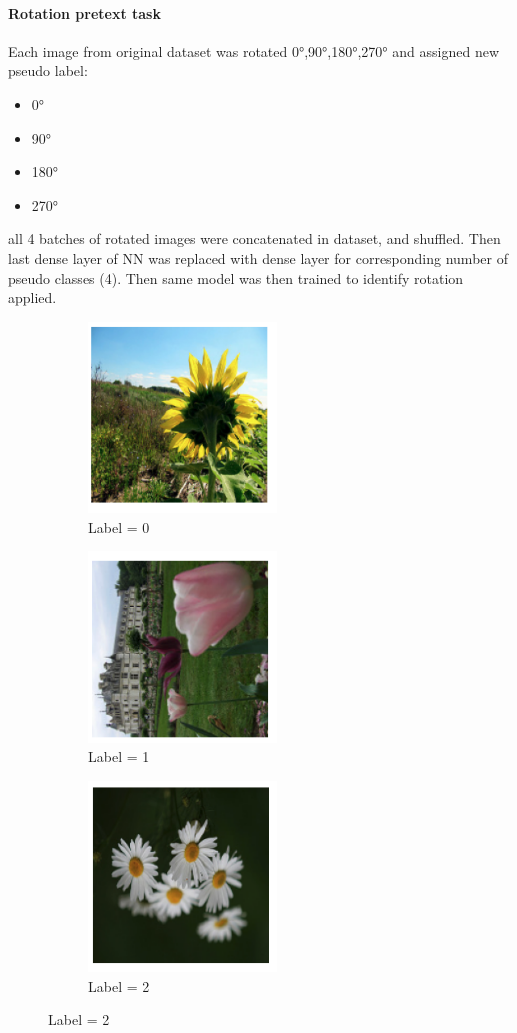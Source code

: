 \paragraph{Rotation pretext task}
Each image from original dataset was rotated 0°,90°,180°,270° and assigned new pseudo label:
\begin{itemize}
    \item 0° 
    \item 90° 
    \item 180° 
    \item 270° 
\end{itemize}
all 4 batches of rotated images were concatenated in dataset, and shuffled.
Then last dense layer of NN was replaced with dense layer for corresponding number of pseudo classes (4).
Then same model was then trained to identify rotation applied.
\\
\begin{figure}[!htp]
    \begin{subfigure}{0.33\textwidth}
        \caption{Label = 0}
        \includegraphics[width=5cm]{images/rot_0}
    \end{subfigure}
    \begin{subfigure}{0.2\textwidth}
        \caption{Label = 1}
        \includegraphics[width=5cm]{images/rot_1}
    \end{subfigure}
    \begin{subfigure}{0.33\textwidth}
        \caption{Label = 2}
        \includegraphics[width=5cm]{images/rot_2}
    \end{subfigure}
\end{figure}

